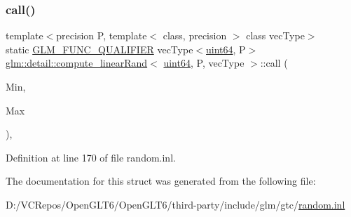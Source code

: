 \subsubsection{\texorpdfstring{call()}{call()}}
{\footnotesize\ttfamily template$<$precision P, template$<$ class, precision $>$ class vec\+Type$>$ \\
static \mbox{\hyperlink{setup_8hpp_a33fdea6f91c5f834105f7415e2a64407}{G\+L\+M\+\_\+\+F\+U\+N\+C\+\_\+\+Q\+U\+A\+L\+I\+F\+I\+ER}} vec\+Type$<$\mbox{\hyperlink{namespaceglm_1_1detail_adec4b19bf4982125e122db2fe03c5810}{uint64}}, P$>$ \mbox{\hyperlink{structglm_1_1detail_1_1compute__linear_rand}{glm\+::detail\+::compute\+\_\+linear\+Rand}}$<$ \mbox{\hyperlink{namespaceglm_1_1detail_adec4b19bf4982125e122db2fe03c5810}{uint64}}, P, vec\+Type $>$\+::call (\begin{DoxyParamCaption}\item[{vec\+Type$<$ \mbox{\hyperlink{namespaceglm_1_1detail_adec4b19bf4982125e122db2fe03c5810}{uint64}}, P $>$ const \&}]{Min,  }\item[{vec\+Type$<$ \mbox{\hyperlink{namespaceglm_1_1detail_adec4b19bf4982125e122db2fe03c5810}{uint64}}, P $>$ const \&}]{Max }\end{DoxyParamCaption})\hspace{0.3cm}{\ttfamily [inline]}, {\ttfamily [static]}}



Definition at line 170 of file random.\+inl.



The documentation for this struct was generated from the following file\+:\begin{DoxyCompactItemize}
\item 
D\+:/\+V\+C\+Repos/\+Open\+G\+L\+T6/\+Open\+G\+L\+T6/third-\/party/include/glm/gtc/\mbox{\hyperlink{random_8inl}{random.\+inl}}\end{DoxyCompactItemize}
